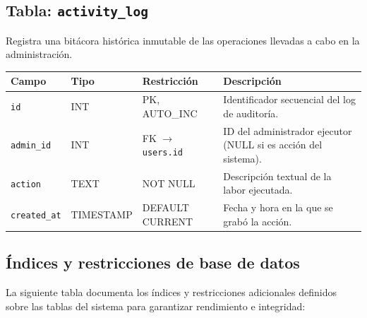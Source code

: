 \documentclass[11pt,a4paper]{report}
\begin{document}
\subsection{Tabla: \texttt{activity\_log}}
Registra una bitácora histórica inmutable de las operaciones llevadas a cabo en la administración.
\begin{table}[H]
\centering
\begin{tabularx}{\textwidth}{|l|l|l|L|}
\hline
{}\textbf{Campo} & \textbf{Tipo} & \textbf{Restricción} & \textbf{Descripción} \\ \hline
\texttt{id} & INT & PK, AUTO\_INC & Identificador secuencial del log de auditoría. \\ \hline
\texttt{admin\_id} & INT & FK $\rightarrow$ \texttt{users.id} & ID del administrador ejecutor (NULL si es acción del sistema). \\ \hline
\texttt{action} & TEXT & NOT NULL & Descripción textual de la labor ejecutada. \\ \hline
\texttt{created\_at} & TIMESTAMP & DEFAULT CURRENT & Fecha y hora en la que se grabó la acción. \\ \hline
\end{tabularx}
\end{table}

\subsection{Índices y restricciones de base de datos}
La siguiente tabla documenta los índices y restricciones adicionales definidos sobre las tablas del sistema para garantizar rendimiento e integridad:
\end{document}
